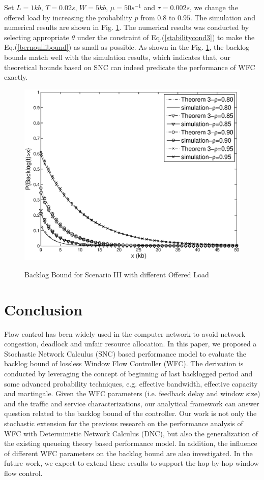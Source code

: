 \documentclass[paper]{ieice}
\begin{document}
Set $L=1kb$, $T=0.02s$, $W=5kb$, $\mu=50s^{-1}$ and $\tau=0.002s$, we change the offered load by increasing the probability $p$ from $0.8$ to $0.95$. The simulation and numerical results are shown in Fig. \ref{result2}. The numerical results was conducted by selecting appropriate $\theta$ under the constraint of Eq.(\ref{stabilitycond3}) to make the Eq.(\ref{bernoullibound}) as small as possible. As shown in the Fig. \ref{result2}, the backlog bounds match well with the simulation results, which indicates that, our theoretical bounds based on SNC can indeed predicate the performance of WFC exactly.
\begin{figure}[tbp]
  \centering
  \includegraphics[scale=0.45]{figures/backlogrho.eps}\\
  \caption{Backlog Bound for Scenario III with different Offered Load}\label{result2}
\end{figure}

\section{Conclusion}\label{concluson}
Flow control has been widely used in the computer network to avoid network congestion, deadlock and unfair resource allocation. In this paper, we proposed a Stochastic Network Calculus (SNC) based performance model to evaluate the backlog bound of lossless Window Flow Controller (WFC). The derivation is conducted by leveraging the concept of beginning of last backlogged period and some advanced probability techniques, e.g. effective bandwidth, effective capacity and martingale. Given the WFC parameters (i.e. feedback delay and window size) and the traffic and service characterizations, our analytical framework can answer question related to the backlog bound of the controller. Our work is not only the stochastic extension for the previous research on the performance analysis of WFC with Deterministic Network Calculus (DNC), but also the generalization of the existing queueing theory based performance model. In addition, the influence of different WFC parameters on the backlog bound are also investigated. In the future work, we expect to extend these results to support the hop-by-hop window flow control.
\end{document}
